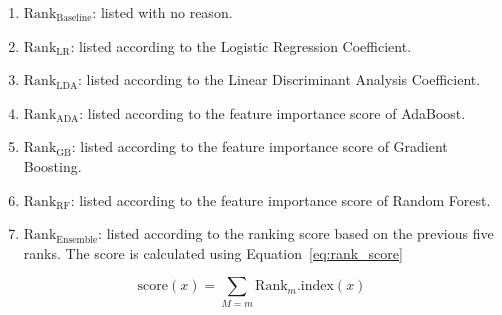\documentclass[pdflatex,sn-mathphys]{sn-jnl}%
\theoremstyle{thmstyleone}%
\theoremstyle{thmstyletwo}%
\theoremstyle{thmstylethree}%
\begin{document}


\begin{enumerate}
    \item $\text{Rank}_{\text{Baseline}}$: listed with no reason.
    \item $\text{Rank}_{\text{LR}}$: listed according to the Logistic Regression Coefficient.
    \item $\text{Rank}_{\text{LDA}}$: listed according to the Linear Discriminant Analysis Coefficient.
    \item $\text{Rank}_{\text{ADA}}$: listed according to the feature importance score of AdaBoost.
    \item $\text{Rank}_{\text{GB}}$: listed according to the feature importance score of Gradient Boosting.
    \item $\text{Rank}_{\text{RF}}$: listed according to the feature importance score of Random Forest.
    \item $\text{Rank}_{\text{Ensemble}}$: listed according to the ranking score based on the previous five ranks. The score is calculated using Equation~\ref{eq:rank_score}
\end{enumerate}

\begin{equation} \label{eq:rank_score}
   \text{score}(x) = \sum_{M=m} \text{Rank}_{m}.\text{index}(x)
\end{equation}
\end{document}
